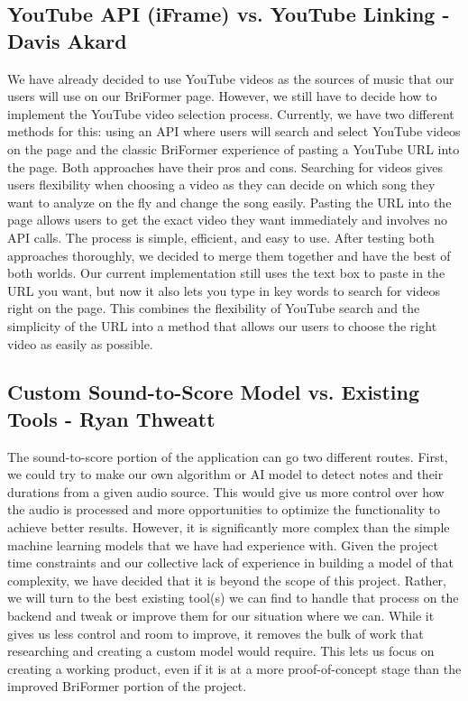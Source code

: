 \documentclass[12pt, letterpaper]{article}
\begin{document}
\subsection*{YouTube API (iFrame) vs. YouTube Linking - Davis Akard}
We have already decided to use YouTube videos as the sources of music that our users will use on our BriFormer page. However, we still have to decide how to implement the YouTube video selection process. Currently, we have two different methods for this: using an API where users will search and select YouTube videos on the page and the classic BriFormer experience of pasting a YouTube URL into the page. Both approaches have their pros and cons. Searching for videos gives users flexibility when choosing a video as they can decide on which song they want to analyze on the fly and change the song easily. Pasting the URL into the page allows users to get the exact video they want immediately and involves no API calls. The process is simple, efficient, and easy to use. After testing both approaches thoroughly, we decided to merge them together and have the best of both worlds. Our current implementation still uses the text box to paste in the URL you want, but now it also lets you type in key words to search for videos right on the page. This combines the flexibility of YouTube search and the simplicity of the URL into a method that allows our users to choose the right video as easily as possible.

\subsection*{Custom Sound-to-Score Model vs. Existing Tools - Ryan Thweatt}
The sound-to-score portion of the application can go two different routes. First, we could try to make our own algorithm or AI model to detect notes and their durations from a given audio source. This would give us more control over how the audio is processed and more opportunities to optimize the functionality to achieve better results. However, it is significantly more complex than the simple machine learning models that we have had experience with. Given the project time constraints and our collective lack of experience in building a model of that complexity, we have decided that it is beyond the scope of this project. Rather, we will turn to the best existing tool(s) we can find to handle that process on the backend and tweak or improve them for our situation where we can. While it gives us less control and room to improve, it removes the bulk of work that researching and creating a custom model would require. This lets us focus on creating a working product, even if it is at a more proof-of-concept stage than the improved BriFormer portion of the project.
\end{document}

